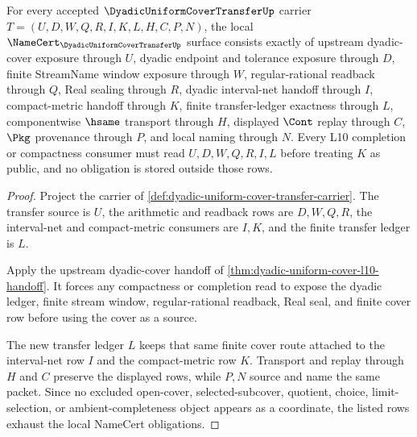 \begin{theorem}
\label{thm:dyadic-uniform-cover-transfer-namecert-obligations}
For every accepted $\DyadicUniformCoverTransferUp$ carrier $T=(U,D,W,Q,R,I,K,L,H,C,P,N)$, the local $\NameCert_{\DyadicUniformCoverTransferUp}$ surface consists exactly of upstream dyadic-cover exposure through $U$, dyadic endpoint and tolerance exposure through $D$, finite StreamName window exposure through $W$, regular-rational readback through $Q$, Real sealing through $R$, dyadic interval-net handoff through $I$, compact-metric handoff through $K$, finite transfer-ledger exactness through $L$, componentwise $\hsame$ transport through $H$, displayed $\Cont$ replay through $C$, $\Pkg$ provenance through $P$, and local naming through $N$. Every L10 completion or compactness consumer must read $U,D,W,Q,R,I,L$ before treating $K$ as public, and no obligation is stored outside those rows.
\end{theorem}
\begin{proof}
Project the carrier of \autoref{def:dyadic-uniform-cover-transfer-carrier}. The transfer source is $U$, the arithmetic and readback rows are $D,W,Q,R$, the interval-net and compact-metric consumers are $I,K$, and the finite transfer ledger is $L$.

Apply the upstream dyadic-cover handoff of \autoref{thm:dyadic-uniform-cover-l10-handoff}. It forces any compactness or completion read to expose the dyadic ledger, finite stream window, regular-rational readback, Real seal, and finite cover row before using the cover as a source.

The new transfer ledger $L$ keeps that same finite cover route attached to the interval-net row $I$ and the compact-metric row $K$. Transport and replay through $H$ and $C$ preserve the displayed rows, while $P,N$ source and name the same packet. Since no excluded open-cover, selected-subcover, quotient, choice, limit-selection, or ambient-completeness object appears as a coordinate, the listed rows exhaust the local NameCert obligations.
\end{proof}

